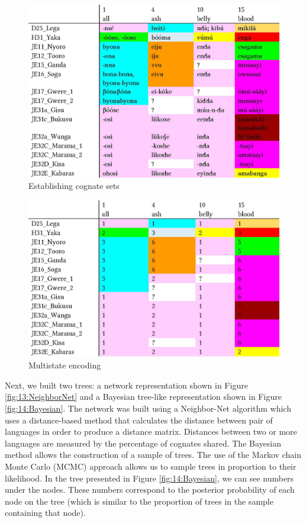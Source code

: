 \documentclass[output=paper]{langscibook}
\begin{document}
\begin{figure}[p]
  \caption{Establishing cognate sets}
  \label{fig:11:CognateSets}
   \includegraphics[width=\textwidth]{figures/11 Cognate sets.jpg}
\end{figure}

\begin{figure}[p]
  \caption{Multistate encoding}
  \label{fig:9:Multistate}
   \includegraphics[width=\textwidth]{figures/12 Multistate encoding.jpg}
\end{figure}

Next, we built two trees: a network representation shown in Figure \ref{fig:13:NeighborNet} and a Bayesian tree-like representation shown in Figure \ref{fig:14:Bayesian}. The network was built using a Neighbor-Net algorithm \citep{bryant_neighbor-net:_2004} which uses a distance-based method that calculates the distance between pair of languages in order to produce a distance matrix. Distances between two or more languages are measured by the percentage of cognates shared. The Bayesian method allows the construction of a sample of trees. The use of the Markov chain Monte Carlo (MCMC) approach \citep{larget_markov_1999,pagel_phylogenetic_2004} allows us to sample trees in proportion to their likelihood. In the tree presented in Figure \ref{fig:14:Bayesian}, we can see numbers under the nodes. These numbers correspond to the posterior probability of each node on the tree (which is similar to the proportion of trees in the sample containing that node). 
\end{document}
